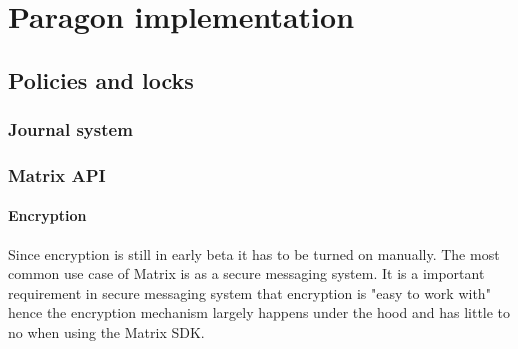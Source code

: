 


\section{Paragon implementation}


\subsection{Policies and locks}

\subsubsection{Journal system}



\subsubsection{Matrix API}



\paragraph{Encryption}
Since encryption is still in early beta it has to be turned on manually. The most common use case of Matrix is as a secure messaging system. It is a important requirement in secure messaging system that encryption is "easy to work with" hence the encryption mechanism largely happens under the hood and has little to no when using the Matrix SDK.


